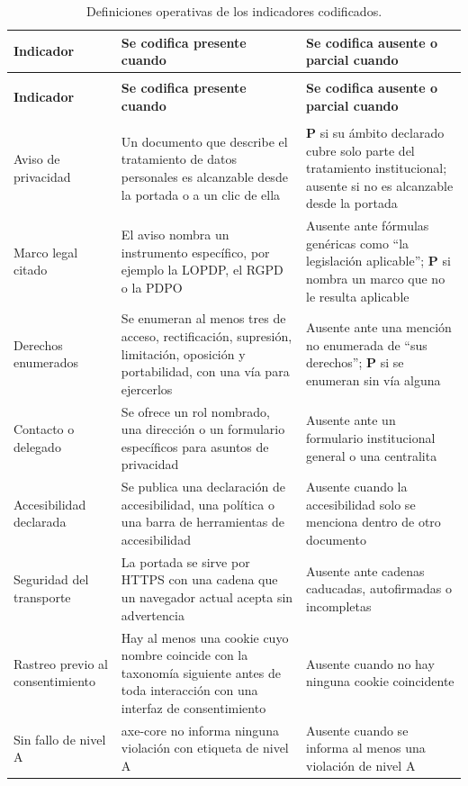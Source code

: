\documentclass[pdflatex,sn-basic,Numbered]{sn-jnl}
\theoremstyle{thmstyleone}
\theoremstyle{thmstyletwo}
\theoremstyle{thmstylethree}
\begin{document}
\begin{appendices}
\footnotesize
\begin{longtable}{@{}>{\RaggedRight}p{2.7cm}>{\RaggedRight}p{4.75cm}>{\RaggedRight\arraybackslash}p{4.55cm}@{}}
	\caption{Definiciones operativas de los indicadores codificados.}\label{tab:codebook}\\
	\toprule
	\textbf{Indicador} & \textbf{Se codifica presente cuando} & \textbf{Se codifica ausente o parcial cuando} \\
	\midrule
	\endfirsthead
	\multicolumn{3}{c}{\textit{(Cuadro~\ref{tab:codebook}, continuaci\'on)}}\\
	\toprule
	\textbf{Indicador} & \textbf{Se codifica presente cuando} & \textbf{Se codifica ausente o parcial cuando} \\
	\midrule
	\endhead
	\midrule
	\multicolumn{3}{r}{\textit{Contin\'ua en la siguiente p\'agina}}\\
	\endfoot
	\bottomrule
	\endlastfoot
	Aviso de privacidad & Un documento que describe el tratamiento de datos personales es alcanzable desde la portada o a un clic de ella & \textbf{P} si su \'ambito declarado cubre solo parte del tratamiento institucional; ausente si no es alcanzable desde la portada \\
	\addlinespace
	Marco legal citado & El aviso nombra un instrumento espec\'ifico, por ejemplo la LOPDP, el RGPD o la PDPO & Ausente ante f\'ormulas gen\'ericas como ``la legislaci\'on aplicable''; \textbf{P} si nombra un marco que no le resulta aplicable \\
	\addlinespace
	Derechos enumerados & Se enumeran al menos tres de acceso, rectificaci\'on, supresi\'on, limitaci\'on, oposici\'on y portabilidad, con una v\'ia para ejercerlos & Ausente ante una menci\'on no enumerada de ``sus derechos''; \textbf{P} si se enumeran sin v\'ia alguna \\
	\addlinespace
	Contacto o delegado & Se ofrece un rol nombrado, una direcci\'on o un formulario espec\'ificos para asuntos de privacidad & Ausente ante un formulario institucional general o una centralita \\
	\addlinespace
	Accesibilidad declarada & Se publica una declaraci\'on de accesibilidad, una pol\'itica o una barra de herramientas de accesibilidad & Ausente cuando la accesibilidad solo se menciona dentro de otro documento \\
	\addlinespace
	Seguridad del transporte & La portada se sirve por HTTPS con una cadena que un navegador actual acepta sin advertencia & Ausente ante cadenas caducadas, autofirmadas o incompletas \\
	\addlinespace
	Rastreo previo al consentimiento & Hay al menos una cookie cuyo nombre coincide con la taxonom\'ia siguiente antes de toda interacci\'on con una interfaz de consentimiento & Ausente cuando no hay ninguna cookie coincidente \\
	\addlinespace
	Sin fallo de nivel A & axe-core no informa ninguna violaci\'on con etiqueta de nivel A & Ausente cuando se informa al menos una violaci\'on de nivel A \\
\end{longtable}
\normalsize


\end{appendices}
\end{document}
